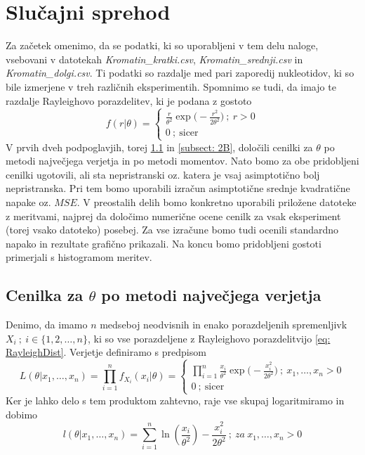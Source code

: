 \documentclass[a4paper, 10pt]{article}
\begin{document}
	\section{Slučajni sprehod} \label{sect: SlucajniSprehod}
	Za začetek omenimo, da se podatki, ki so uporabljeni v tem delu naloge, vsebovani v datotekah \textit{Kromatin\_kratki.csv}, \textit{Kromatin\_srednji.csv} in \textit{Kromatin\_dolgi.csv}. Ti podatki so razdalje med pari zaporedij nukleotidov, ki so bile izmerjene v treh različnih eksperimentih. Spomnimo se tudi, da imajo te razdalje Rayleighovo porazdelitev, ki je podana z gostoto \begin{equation*}\label{eq: RayleighDist}
		f(r|\theta) = \begin{cases}
			\frac{r}{\theta^2}\exp\big(-\frac{r^2}{2\theta^2}\big)~;~r>0 \\
			0~;~\text{sicer}
		\end{cases}
	\end{equation*}
	V prvih dveh podpoglavjih, torej \ref{subsect: 2A} in \ref{subsect: 2B}, določili cenilki za $\theta$ po metodi največjega verjetja in po metodi momentov. Nato bomo za obe pridobljeni cenilki ugotovili, ali sta nepristranski oz. katera je vsaj asimptotično bolj nepristranska. Pri tem bomo uporabili izračun asimptotične srednje kvadratične napake oz. $MSE$. V preostalih delih bomo konkretno uporabili priložene datoteke z meritvami, najprej da določimo numerične ocene cenilk za vsak eksperiment (torej vsako datoteko) posebej. Za vse izračune bomo tudi ocenili standardno napako in rezultate grafično prikazali. Na koncu bomo pridobljeni gostoti primerjali s histogramom meritev.
	\subsection{Cenilka za $\theta$ po metodi največjega verjetja} \label{subsect: 2A}
	Denimo, da imamo $n$ medseboj neodvisnih in enako porazdeljenih spremenljivk $X_i~;~i\in\{1, 2, \ldots, n\}$, ki so vse porazdeljene z Rayleighovo porazdelitvijo \ref{eq: RayleighDist}. Verjetje definiramo s predpisom \begin{equation*}
		L(\theta | x_1, \ldots, x_n) = \prod_{i = 1}^{n} f_{X_i}(x_i | \theta) = \begin{cases}
			\prod_{i = 1}^{n} \frac{x_i}{\theta^2}\exp\big(-\frac{x_i^2}{2\theta^2}\big)~;~ x_1, \ldots, x_n > 0 \\
			0~;~\text{sicer}
		\end{cases}
	\end{equation*}
	Ker je lahko delo s tem produktom zahtevno, raje vse skupaj logaritmiramo in dobimo $$l(\theta|x_1,\ldots, x_n) = \sum_{i = 1}^{n} \ln(\frac{x_i}{\theta^2}) - \frac{x_i^2}{2\theta^2}~;~\textit{za}~ x_1,\ldots,x_n >0$$
	
\end{document}
